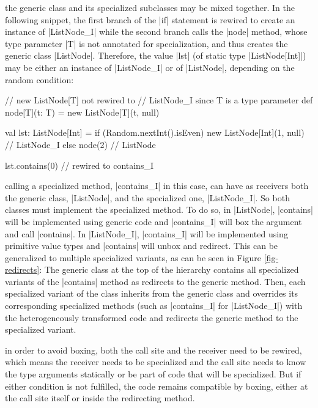  the generic class and its specialized subclasses may be mixed together. In the following snippet, the first branch of the |if| statement is rewired to create an instance of |ListNode_I| while the second branch calls the |node| method, whose type parameter |T| is not annotated for specialization, and thus creates the generic class |ListNode|. Therefore, the value |lst| (of static type |ListNode[Int]|) may be either an instance of |ListNode_I| or of |ListNode|, depending on the random condition:

\begin{lstlisting-nobreak}
 // new ListNode[T] not rewired to
 // ListNode_I since T is a type parameter 
 def node[T](t: T) = new ListNode[T](t, null)

 val lst: ListNode[Int] = 
   if (Random.nextInt().isEven)
     new ListNode[Int](1, null) // ListNode_I
   else
     node(2)                             // ListNode
    
 lst.contains(0) // rewired to contains_I
\end{lstlisting-nobreak}

 calling a specialized method, |contains_I| in this case, can have as receivers both the generic class, |ListNode|, and the specialized one, |ListNode_I|. So both classes must implement the specialized method. To do so, in |ListNode|, |contains| will be implemented using generic code and |contains_I| will box the argument and call |contains|. In |ListNode_I|, |contains_I| will be implemented using primitive value types and |contains| will unbox and redirect. This can be generalized to multiple specialized variants, as can be seen in Figure \ref{fig-redirects}: The generic class at the top of the hierarchy contains all specialized variants of the |contains| method as redirects to the generic method. Then, each specialized variant of the class inherits from the generic class and overrides its corresponding specialized methods (such as |contains_I| for |ListNode_I|) with the heterogeneously transformed code and redirects the generic method to the specialized variant. 

 in order to avoid boxing, both the call site and the receiver need to be rewired, which means the receiver needs to be specialized and the call site needs to know the type arguments statically or be part of code that will be specialized. But if either condition is not fulfilled, the code remains compatible by boxing, either at the call site itself or inside the redirecting method. 

